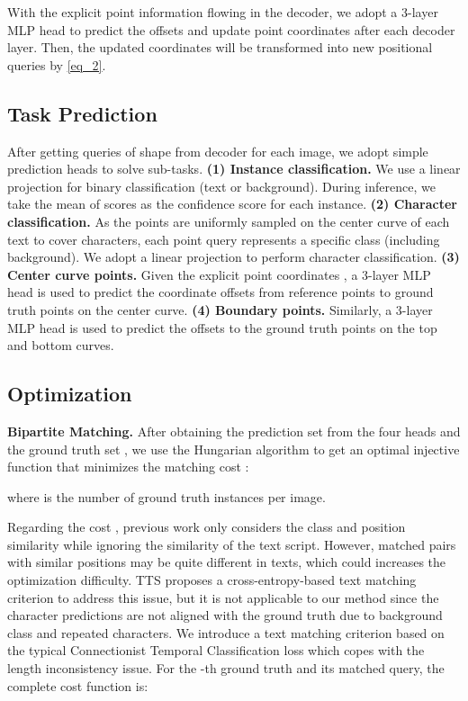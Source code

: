 \documentclass[10pt,twocolumn,letterpaper]{article}
\begin{document}
With the explicit point information flowing in the decoder, we adopt a 3-layer MLP head to predict the offsets and update point coordinates after each decoder layer. Then, the updated coordinates will be transformed into new positional queries by \cref{eq_2}.

\subsection{Task Prediction}
After getting queries of shape  from decoder for each image, we adopt simple prediction heads to solve sub-tasks. \textbf{(1) Instance classification.} We use a linear projection for binary classification (text or background). During inference, we take the mean of  scores as the confidence score for each instance.
\textbf{(2) Character classification.} As the points are uniformly sampled on the center curve of each text to cover characters, each point query represents a specific class (including background). We adopt a linear projection to perform character classification.
\textbf{(3) Center curve points.} Given the explicit point coordinates , a 3-layer MLP head  is used to predict the coordinate offsets from reference points to ground truth points on the center curve.
\textbf{(4) Boundary points.} Similarly, a 3-layer MLP head  is used to predict the offsets to the ground truth points on the top and bottom curves. 

\subsection{Optimization}
\noindent \textbf{Bipartite Matching.} After obtaining the prediction set  from the four heads and the ground truth set , we use the Hungarian algorithm \cite{kuhn1955hungarian} to get an optimal injective function  that minimizes the matching cost :

where  is the number of ground truth instances per image. 

Regarding the cost , previous work \cite{zhang2022text} only considers the class and position similarity while ignoring the similarity of the text script. However, matched pairs with similar positions may be quite different in texts, which could increases the optimization difficulty. TTS \cite{kittenplon2022towards} proposes a cross-entropy-based text matching criterion to address this issue, but it is not applicable to our method since the character predictions are not aligned with the ground truth due to background class and repeated characters. We introduce a text matching criterion based on the typical Connectionist Temporal Classification loss \cite{graves2006connectionist} which copes with the length inconsistency issue. For the -th ground truth and its matched query, the complete cost function is:
\end{document}
